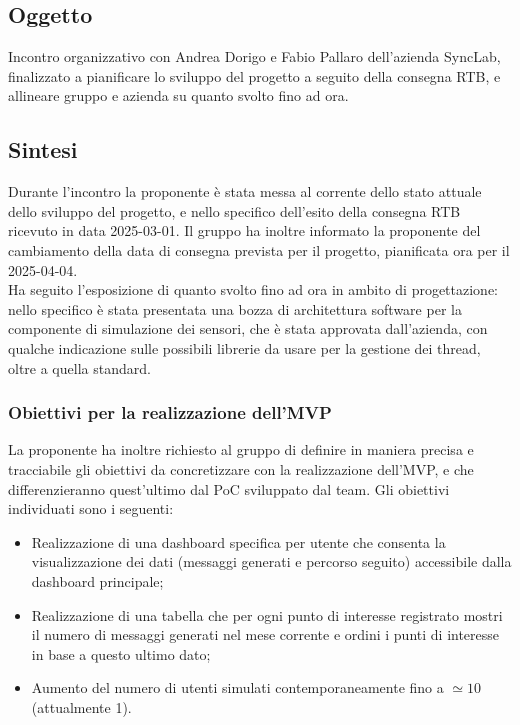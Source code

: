 \documentclass[10pt]{article}
\begin{document}
\subsection{Oggetto}
Incontro organizzativo con Andrea Dorigo e Fabio Pallaro dell'azienda SyncLab, finalizzato a pianificare lo sviluppo del progetto a seguito della consegna RTB, 
e allineare gruppo e azienda su quanto svolto fino ad ora.

\subsection{Sintesi}
Durante l'incontro la proponente è stata messa al corrente dello stato attuale dello sviluppo del progetto, e nello specifico dell'esito della consegna RTB ricevuto in data
2025-03-01. Il gruppo ha inoltre informato la proponente del cambiamento della data di consegna prevista per il progetto, pianificata ora per il 2025-04-04.\\
Ha seguito l'esposizione di quanto svolto fino ad ora in ambito di progettazione: nello specifico è stata presentata una bozza di architettura software per la componente
di simulazione dei sensori, che è stata approvata dall'azienda, con qualche indicazione sulle possibili librerie da usare per la gestione dei thread, oltre a quella 
standard.\\

\subsubsection{Obiettivi per la realizzazione dell'MVP}
La proponente ha inoltre richiesto al gruppo di definire in maniera precisa e tracciabile gli obiettivi da concretizzare con la realizzazione dell'MVP, e che differenzieranno
quest'ultimo dal PoC sviluppato dal team. Gli obiettivi individuati sono i seguenti:
\begin{itemize}
    \item Realizzazione di una dashboard specifica per utente che consenta la visualizzazione dei dati (messaggi generati e percorso seguito) accessibile dalla dashboard 
    principale;
    \item Realizzazione di una tabella che per ogni punto di interesse registrato mostri il numero di messaggi generati nel mese corrente e ordini i punti di interesse in base a questo ultimo dato;
    \item Aumento del numero di utenti simulati contemporaneamente fino a $\simeq10$ (attualmente 1).
\end{itemize}
\end{document}
